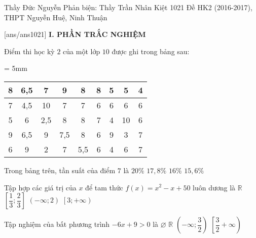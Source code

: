 \begin{name}
{Thầy Đức Nguyễn \newline Phản biện: Thầy Trần Nhân Kiệt}
{1021 Đề HK2 (2016-2017), THPT Nguyễn Huệ, Ninh Thuận}%
	\end{name}
	\setcounter{ex}{0}\setcounter{bt}{0}
	[ans/ans1021]
\noindent\textbf{I. PHẦN TRẮC NGHIỆM}
\begin{ex}%
Điểm thi học kỳ $2$ của một lớp $10$ được ghi trong bảng sau:	
	\begin{center}
		\tabcolsep = 5mm
		\begin{tabular}{|c|c|c|c|c|c|c|c|c|}
		\hline 
		8&6,5&7&9&8&8&5&5&4\\ 	\hline 
		7&4,5&10&7&7&6&6&6&6\\ 	\hline
		5&6&2,5&8&8&7&4&10&6\\ 	\hline
		9&6,5&9&7,5&8&6&9&3&7\\ 	\hline
		6&9&2&7&5,5&6&4&6&7\\ 	\hline
	\end{tabular}	
	\end{center}
Trong bảng trên, tần suất của điểm $7$ là
	\choice
	{$20\%$}
	{\True $17,8\%$}
	{$16\%$}
	{$15,6\%$}
\end{ex}
\begin{ex}%
	Tập hợp các giá trị của $x$ để tam thức $f(x)=x^2-x+50$ luôn dương là
	\choice
	{\True $\mathbb{R}$}
	{$\left[\dfrac{1}{3};\dfrac{2}{3}\right]$}
	{$\left(-\infty;2\right)$}
	{$\left[3;+\infty\right)$}
\end{ex}
\begin{ex}%
	Tập nghiệm của bất phương trình $-6x+9>0$ là 
	\choice
	{$\varnothing$}
	{$\mathbb{R}$}
	{\True $\left(-\infty;\dfrac{3}{2}\right)$}
	{$\left[\dfrac{3}{2}+\infty\right)$}
\end{ex}

